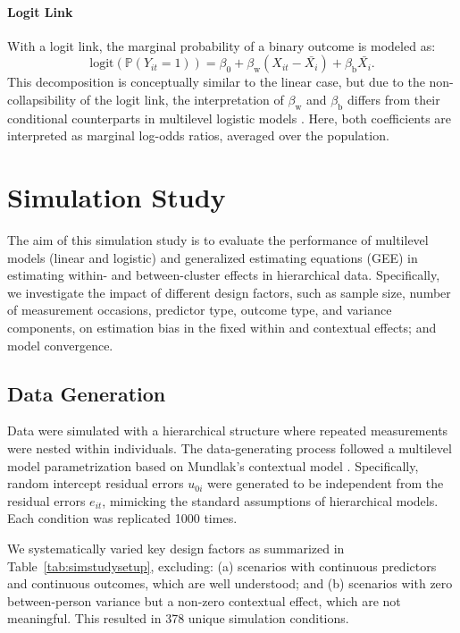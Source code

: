 \documentclass[stu]{apa7}
\begin{document}
\paragraph{Logit Link}

With a logit link, the marginal probability of a binary outcome is modeled as:
\begin{equation}
\text{logit}(\mathbb{P}(Y_{it} = 1)) = \beta_0 + \beta_\text{w}(X_{it} - \bar{X_i}) + \beta_\text{b} \bar{X_i}.
\end{equation}
This decomposition is conceptually similar to the linear case, but due to the non-collapsibility of the logit link, the interpretation of \( \beta_\text{w} \) and \( \beta_\text{b} \) differs from their conditional counterparts in multilevel logistic models \parencite{liang_longitudinal_1986, greenland_confounding_1999}. Here, both coefficients are interpreted as marginal log-odds ratios, averaged over the population.

\newpage

\section{Simulation Study}

The aim of this simulation study is to evaluate the performance of multilevel models (linear and logistic) and generalized estimating equations (GEE) in estimating within- and between-cluster effects in hierarchical data. Specifically, we investigate the impact of different design factors, such as sample size, number of measurement occasions, predictor type, outcome type, and variance components, on estimation bias in the fixed within and contextual effects; and model convergence.

\subsection{Data Generation}

Data were simulated with a hierarchical structure where repeated measurements were nested within individuals. The data-generating process followed a multilevel model parametrization based on Mundlak's contextual model \parencite{mundlak_pooling_1978}. Specifically, random intercept residual errors $u_{0i}$ were generated to be independent from the residual errors \( e_{it} \), mimicking the standard assumptions of hierarchical models. Each condition was replicated 1000 times.

We systematically varied key design factors as summarized in Table~\ref{tab:simstudysetup}, excluding: (a) scenarios with continuous predictors and continuous outcomes, which are well understood; and (b) scenarios with zero between-person variance but a non-zero contextual effect, which are not meaningful. This resulted in 378 unique simulation conditions.
\end{document}
